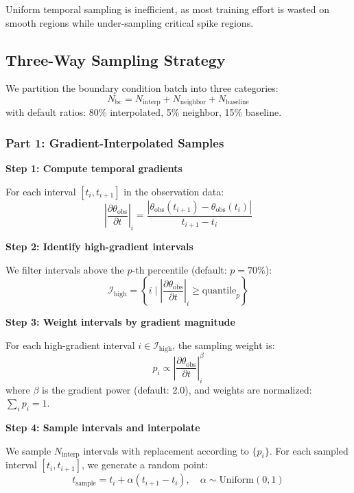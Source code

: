 \documentclass[11pt,a4paper]{article}
\begin{document}
Uniform temporal sampling is inefficient, as most training effort is wasted on smooth regions while under-sampling critical spike regions.

\subsection{Three-Way Sampling Strategy}

We partition the boundary condition batch into three categories:
\begin{equation}
    N_{\text{bc}} = N_{\text{interp}} + N_{\text{neighbor}} + N_{\text{baseline}}
\end{equation}
with default ratios: 80\% interpolated, 5\% neighbor, 15\% baseline.

\subsubsection{Part 1: Gradient-Interpolated Samples}

\textbf{Step 1: Compute temporal gradients}

For each interval $[t_i, t_{i+1}]$ in the observation data:
\begin{equation}
    \left|\frac{\partial \theta_{\text{obs}}}{\partial t}\right|_i = \frac{|\theta_{\text{obs}}(t_{i+1}) - \theta_{\text{obs}}(t_i)|}{t_{i+1} - t_i}
\end{equation}

\textbf{Step 2: Identify high-gradient intervals}

We filter intervals above the $p$-th percentile (default: $p = 70\%$):
\begin{equation}
    \mathcal{I}_{\text{high}} = \left\{i \mid \left|\frac{\partial \theta_{\text{obs}}}{\partial t}\right|_i \geq \text{quantile}_p\right\}
\end{equation}

\textbf{Step 3: Weight intervals by gradient magnitude}

For each high-gradient interval $i \in \mathcal{I}_{\text{high}}$, the sampling weight is:
\begin{equation}
    p_i \propto \left|\frac{\partial \theta_{\text{obs}}}{\partial t}\right|_i^{\beta}
\end{equation}
where $\beta$ is the gradient power (default: 2.0), and weights are normalized: $\sum_i p_i = 1$.

\textbf{Step 4: Sample intervals and interpolate}

We sample $N_{\text{interp}}$ intervals with replacement according to $\{p_i\}$. For each sampled interval $[t_i, t_{i+1}]$, we generate a random point:
\begin{equation}
    t_{\text{sample}} = t_i + \alpha (t_{i+1} - t_i), \quad \alpha \sim \text{Uniform}(0, 1)
\end{equation}
\end{document}
